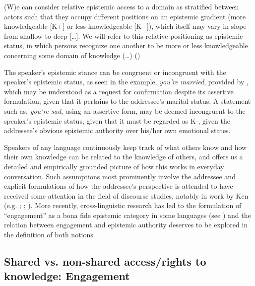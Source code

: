 \documentclass[output=paper]{langsci/langscibook}
\begin{document}
\begin{displayquote}
	(W)e can consider relative epistemic access to a domain as stratified between actors such that they occupy different positions on an epistemic gradient (more knowledgeable [K+] or less knowledgeable [K−]), which itself may vary in slope from shallow to deep […]. We will refer to this relative positioning as epistemic status, in which persons recognize one another to be more or less knowledgeable concerning some domain of knowledge (…) (\citealt[32]{Heritage2012})
\end{displayquote}


The speaker's epistemic stance can be congruent or incongruent with the speaker’s epistemic status, as seen in the example, \emph{you’re married}, provided by \citeauthor{Heritage2012}, which may be understood as a request for confirmation despite its assertive formulation, given that it pertains to the addressee’s marital status. A statement such as, \emph{you’re sad}, using an assertive form, may be deemed incongruent to the speaker’s epistemic status, given that it must be regarded as K-, given the addressee’s obvious epistemic authority over his/her own emotional states.

Speakers of any language continuously keep track of what others know and how their own knowledge can be related to the knowledge of others, and \citeauthor{Heritage2012} offers us a detailed and empirically grounded picture of how this works in everyday conversation. Such assumptions most prominently involve the addressee and explicit formulations of how the addressee’s perspective is attended to have received some attention in the field of discourse studies, notably in work by Ken \citeauthor{Hyland1999} (e.g. \citeyear{Hyland1999}; \citeyear{Hyland2001}; \citeyear{Hyland2005}). More recently, cross-linguistic research has led to the formulation of “engagement” as a bona fide epistemic category in some languages (see \citealt{Evansetal2017a}) and the relation between engagement and epistemic authority deserves to be explored in the definition of both notions.

\subsection{Shared vs. non-shared access/rights to knowledge: Engagement}\label{s:hb3-3}
\end{document}

